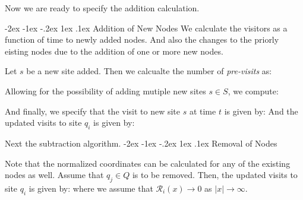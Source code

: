 \documentclass[onecolumn, compsoc,10pt]{IEEEtran}
\makeatletter
\renewcommand\section{\@startsection {section}{1}{\z@}%
  {-2ex \@plus -1ex \@minus -.2ex}%
  {1ex \@plus.1ex}%
  {\LARGE\bfseries\scshape}}
\makeatother
\begin{document}
Now we are ready to specify the addition calculation. 
{\color{gray}
\section{Addition of New Nodes}
We calculate the visitors as a function of time to newly added nodes. And also the changes to the priorly eisting nodes due to the addition of one or more new nodes.

Let $s$ be a new site added. Then we calcualte the number of \textit{pre-visits} as:

Allowing for the possibility of adding mutiple new sites $s \in S$, we compute:

And finally, we specify that  the visit to new site $s$ at time $t$ is given by:
And the updated  visits to site $q_i$ is given by:
}
Next the subtraction algorithm.
\section{Removal of Nodes}

Note that the normalized coordinates can be calculated for any of the existing nodes as well. Assume that $q_j \in Q$ is to be removed. Then, the updated visits to site $q_i$ is given by: 
where we assume that $\mathcal{R}_i(x) \rightarrow 0$ as $\vert x \vert  \rightarrow \infty$.
\end{document}
